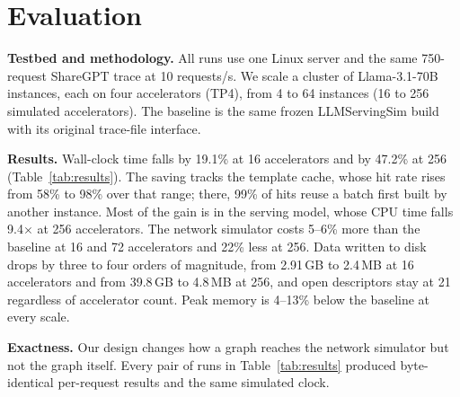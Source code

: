 \documentclass[conference]{IEEEtran}
\begin{document}
\section{Evaluation}

\textbf{Testbed and methodology.} All runs use one Linux server and the same 750-request ShareGPT trace at 10
requests/s. We scale a cluster of Llama-3.1-70B instances, each on
four accelerators (TP4), from 4 to 64 instances (16 to 256 simulated accelerators). The
baseline is the same frozen LLMServingSim build with its original
trace-file interface.

\textbf{Results.} Wall-clock time falls by 19.1\% at 16 accelerators and by
47.2\% at 256 (Table~\ref{tab:results}). The saving tracks the
template cache, whose hit rate rises from 58\% to 98\% over that range; there, 99\% of hits reuse a batch first built by another instance.
Most of the gain is in the serving model, whose CPU time falls
9.4$\times$ at 256 accelerators. The network simulator costs 5--6\% more than
the baseline at 16 and 72 accelerators and 22\% less at 256. Data written
to disk drops by three to four orders of magnitude, from 2.91\,GB to
2.4\,MB at 16 accelerators and from 39.8\,GB to 4.8\,MB at 256, and open
descriptors stay at 21 regardless of accelerator count. Peak memory is
4--13\% below the baseline at every scale.


\textbf{Exactness.} Our design changes how a graph reaches the network
simulator but not the graph itself. Every pair of runs in
Table~\ref{tab:results} produced byte-identical per-request results and
the same simulated clock.
\end{document}
